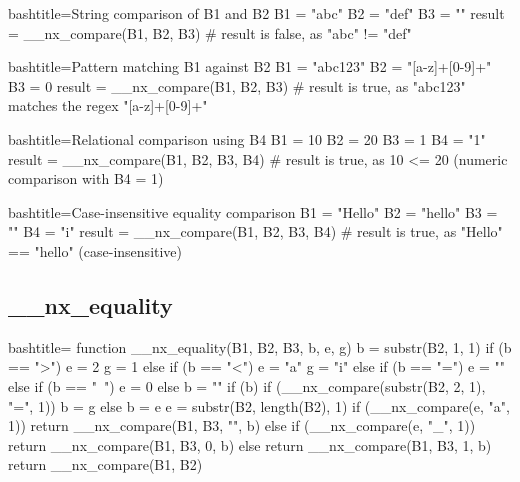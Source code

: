 \begin{NexCodeBox}{bash}{title={String comparison of B1 and B2}}
	B1 = "abc"
	B2 = "def"
	B3 = ""
	result = __nx_compare(B1, B2, B3)
	# result is false, as "abc" != "def"
\end{NexCodeBox}

\begin{NexCodeBox}{bash}{title={Pattern matching B1 against B2}}
	B1 = "abc123"
	B2 = "[a-z]+[0-9]+"
	B3 = 0
	result = __nx_compare(B1, B2, B3)
	# result is true, as "abc123" matches the regex "[a-z]+[0-9]+"
\end{NexCodeBox}

\begin{NexCodeBox}{bash}{title={Relational comparison using B4}}
	B1 = 10
	B2 = 20
	B3 = 1
	B4 = "1"
	result = __nx_compare(B1, B2, B3, B4)
	# result is true, as 10 <= 20 (numeric comparison with B4 = 1)
\end{NexCodeBox}

\begin{NexCodeBox}{bash}{title={Case-insensitive equality comparison}}
	B1 = "Hello"
	B2 = "hello"
	B3 = ""
	B4 = "i"
	result = __nx_compare(B1, B2, B3, B4)
	# result is true, as "Hello" == "hello" (case-insensitive)
\end{NexCodeBox}

\newpage
\subsection{__nx_equality}
\label{__nx_equality}
\begin{NexCodeBox}{bash}{title={}}
function __nx_equality(B1, B2, B3,	b, e, g) {
	b = substr(B2, 1, 1)
	if (b == ">") {
		e = 2
		g = 1
	} else if (b == "<") {
		e = "a"
		g = "i"
	} else if (b == "=") {
		e = ""
	} else if (b == "~") {
		e = 0
	} else {
		b = ""
	}
	if (b) {
		if (__nx_compare(substr(B2, 2, 1), "=", 1)) {
			b = g
		} else {
			b = e
		}
		e = substr(B2, length(B2), 1)
		if (__nx_compare(e, "a", 1))
			return __nx_compare(B1, B3, "", b)
		else if (__nx_compare(e, "_", 1))
			return __nx_compare(B1, B3, 0, b)
		else
			return __nx_compare(B1, B3, 1, b)
	}
	return __nx_compare(B1, B2)
}
\end{NexCodeBox}

